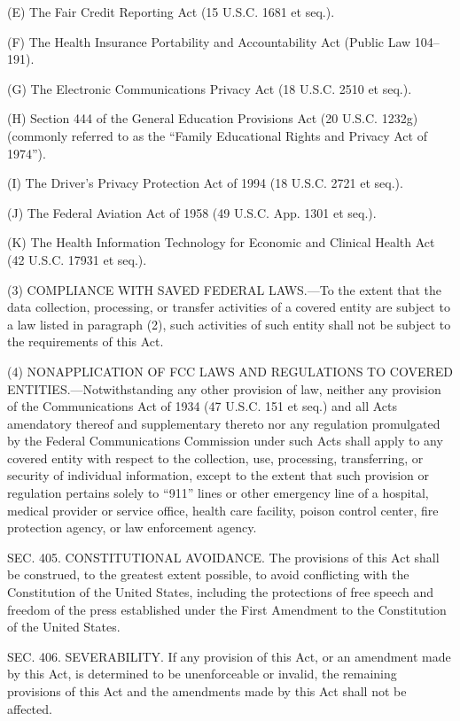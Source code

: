 (E) The Fair Credit Reporting Act (15 U.S.C. 1681 et seq.).

(F) The Health Insurance Portability and Accountability Act (Public Law 104–191).

(G) The Electronic Communications Privacy Act (18 U.S.C. 2510 et seq.).

(H) Section 444 of the General Education Provisions Act (20 U.S.C. 1232g) (commonly referred to as the “Family Educational Rights and Privacy Act of 1974”).

(I) The Driver's Privacy Protection Act of 1994 (18 U.S.C. 2721 et seq.).

(J) The Federal Aviation Act of 1958 (49 U.S.C. App. 1301 et seq.).

(K) The Health Information Technology for Economic and Clinical Health Act (42 U.S.C. 17931 et seq.).

(3) COMPLIANCE WITH SAVED FEDERAL LAWS.—To the extent that the data collection, processing, or transfer activities of a covered entity are subject to a law listed in paragraph (2), such activities of such entity shall not be subject to the requirements of this Act.

(4) NONAPPLICATION OF FCC LAWS AND REGULATIONS TO COVERED ENTITIES.—Notwithstanding any other provision of law, neither any provision of the Communications Act of 1934 (47 U.S.C. 151 et seq.) and all Acts amendatory thereof and supplementary thereto nor any regulation promulgated by the Federal Communications Commission under such Acts shall apply to any covered entity with respect to the collection, use, processing, transferring, or security of individual information, except to the extent that such provision or regulation pertains solely to “911” lines or other emergency line of a hospital, medical provider or service office, health care facility, poison control center, fire protection agency, or law enforcement agency.


SEC. 405. CONSTITUTIONAL AVOIDANCE.
The provisions of this Act shall be construed, to the greatest extent possible, to avoid conflicting with the Constitution of the United States, including the protections of free speech and freedom of the press established under the First Amendment to the Constitution of the United States.


SEC. 406. SEVERABILITY.
If any provision of this Act, or an amendment made by this Act, is determined to be unenforceable or invalid, the remaining provisions of this Act and the amendments made by this Act shall not be affected.